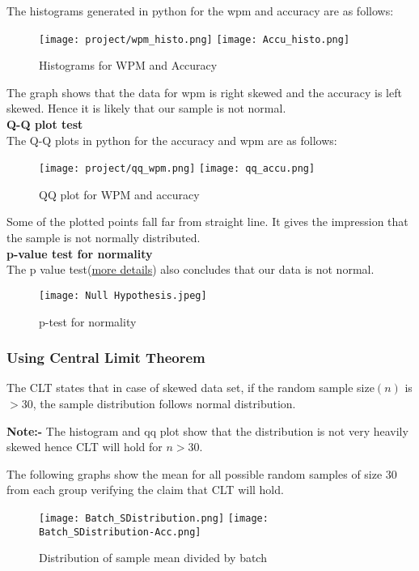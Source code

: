 \documentclass[12pt,a4paper]{report}
\begin{document}
The histograms generated in python  for the wpm and accuracy are as follows:

\begin{figure}[h]
    \centering
    \texttt{[image: project/wpm\_histo.png]}
    \texttt{[image: Accu\_histo.png]}
    \caption{Histograms for WPM and Accuracy}
\end{figure}

The graph shows that the data for wpm is right skewed and the accuracy is left skewed. Hence it is likely that our sample is not normal.\\
\textbf{\large{Q-Q plot test}}\\
The Q-Q plots in python  for the accuracy and wpm  are as follows:

\begin{figure}[h]
    \centering
    \texttt{[image: project/qq\_wpm.png]}
    \texttt{[image: qq\_accu.png]}
    \caption{QQ plot for WPM and accuracy}
\end{figure}

Some of the plotted points fall far from straight line. It gives the impression that the sample is not normally distributed.\\
\textbf{\large{p-value test for normality}}\\
The p value test(\hyperref[sec:Hypothesis Testing]{more details}) also concludes that our data is not normal.
\begin{figure}[h]
    \centering
    \texttt{[image: Null Hypothesis.jpeg]}
    \caption{p-test for normality}
\end{figure}

\subsubsection*{\Large{Using Central Limit Theorem}}

The CLT states that in case of skewed data set, if the random sample size$(n)$ is $> 30$, the sample distribution follows normal distribution.

\textbf{Note:-} The histogram and qq plot show that the distribution is not very heavily skewed hence CLT will hold for $n>30$.

The following graphs show the mean for all possible random samples of size 30 from each group verifying the claim that CLT will hold.

\begin{figure}[h]
    \centering
    \texttt{[image: Batch\_SDistribution.png]}
    \texttt{[image: Batch\_SDistribution-Acc.png]}
    \caption{Distribution of sample mean divided by batch }
\end{figure}
\end{document}
